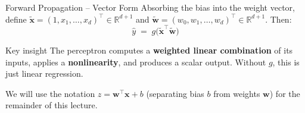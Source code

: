 \documentclass[aspectratio=169,11pt]{beamer}
\newcommand{\x}{\bm{x}}
\newcommand{\w}{\bm{w}}
\newcommand{\R}{\mathbb{R}}
\begin{document}
\begin{frame}{Forward Propagation -- Vector Form}
Absorbing the bias into the weight vector, define
$\tilde{\x} = (1, x_1, \dots, x_d)^\top \in \R^{d+1}$ and
$\tilde{\w} = (w_0, w_1, \dots, w_d)^\top \in \R^{d+1}$. Then:
\[
    \boxed{\hat{y} \;=\; g\!\big(\tilde{\x}^\top \tilde{\w}\big)}
\]

\vspace{0.5cm}
\begin{block}{Key insight}
The perceptron computes a \textbf{weighted linear combination} of its inputs, applies a \textbf{nonlinearity}, and produces a scalar output.  Without $g$, this is just linear regression.
\end{block}

\vspace{0.3cm}
{\small We will use the notation $z = \w^\top\x + b$ (separating bias $b$ from weights $\w$) for the remainder of this lecture.}
\end{frame}
\end{document}
